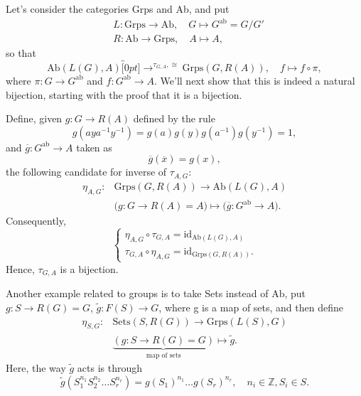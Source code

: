 \documentclass[../category_theory.tex]{subfiles}
\begin{document}
\begin{example}
	Let's consider the categories Grps and Ab, and put
	\begin{align*}
		 & L:\mathrm{Grps}\rightarrow \mathrm{Ab},\quad G\mapsto G^{\mathrm{ab}}=G/G' \\
		 & R:\mathrm{Ab}\rightarrow \mathrm{Grps},\quad A\mapsto A,
	\end{align*}
	so that
	\[
		\mathrm{Ab}(L(G), A)\overbracket[0pt]{\longrightarrow}^{\tau_{G, A}, \cong }\mathrm{Grps}(G, R(A)),\quad f\mapsto f\circ \pi,
	\]
	where \(\pi :G\rightarrow G^{\mathrm{ab}}\) and \(f:G^{\mathrm{ab}}\rightarrow A\). We'll next show that this is indeed a natural bijection, starting with the proof that it is a bijection.

	Define, given \(g:G\rightarrow R(A)\) defined by the rule
	\[
		g(aya^{-1}y^{-1})=g(a)g(y)g(a^{-1})g(y^{-1}) = 1,
	\]
	and \(\overline{g}:G^{\mathrm{ab}}\rightarrow A\) taken as
	\[
		\overline{g}(\overline{x})=g(x),
	\]
	the following candidate for inverse of \(\tau_{A, G}\):
	\begin{align*}
		\eta_{A, G}: & \mathrm{Grps}(G, R(A))\rightarrow \mathrm{Ab}(L(G), A)                                              \\
		             & \biggl(g:G\rightarrow R(A)=A\biggr)\mapsto \biggl(\overline{g}:G^{\mathrm{ab}}\rightarrow A\biggr).
	\end{align*}
	Consequently,
	\[
		\left\{\begin{array}{ll}
			\eta _{A, G}\circ \tau _{G, A} = \mathrm{id}_{\mathrm{Ab}(L(G), A)} \\
			\tau_{G, A}\circ \eta _{A, G}=\mathrm{id}_{\mathrm{Grps}(G, R(A))}.
		\end{array}\right.
	\]
	Hence, \(\tau_{G, A} \) is a bijection.

	Another example related to groups is to take Sets instead of \(\mathrm{Ab}\), put \(g:S\rightarrow R(G)=G\), \(\tilde g:F(S)\rightarrow G\), where g is a map of sets, and then define
	\begin{align*}
		\eta_{S, G}: & \mathrm{Sets}(S, R(G))\rightarrow \mathrm{Grps}(L(S), G)                   \\
		             & \underbrace{(g:S\rightarrow R(G)=G)}_{\text{map of sets}}\mapsto \tilde g.
	\end{align*}
	Here, the way \(\tilde g\) acts is through
	\[
		\tilde g(S_{1}^{n_1}S_{2}^{n_2}\dotsc S_{r}^{n_{r}})=g(S_1)^{n_1}\dotsc g(S_r)^{n_r},\quad n_{i}\in \mathbb{Z}, S_{i}\in S.
	\]
\end{example}
\end{document}
